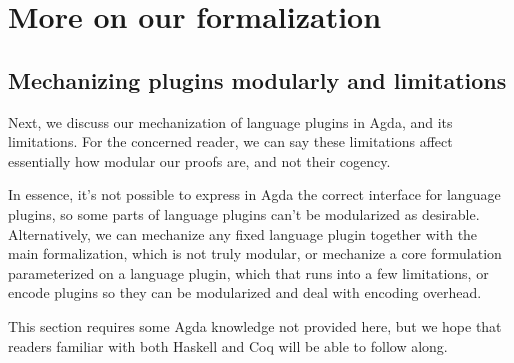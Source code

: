









\def\deriveDefCore{%
\begin{align*}
  \ensuremath{\Derive{\lambda (\Varid{x}\typcolon\sigma)\to \Varid{t}}} &= \ensuremath{\lambda (\Varid{x}\typcolon\sigma)\;(\Varid{dx}\typcolon\Delta \sigma)\to \Derive{\Varid{t}}} \\
  \ensuremath{\Derive{\Varid{s}\;\Varid{t}}} &= \ensuremath{\Derive{\Varid{s}}\;\Varid{t}\;\Derive{\Varid{t}}} \\
  \ensuremath{\Derive{\Varid{x}}} &= \ensuremath{\Varid{dx}} \\
  \ensuremath{\Derive{\Varid{c}}} &= \ensuremath{\DeriveConst{\Varid{c}}}
\end{align*}
}




\chapter{More on our formalization}
\section{Mechanizing plugins modularly and limitations}
\label{sec:modularity-limits}
Next, we discuss our mechanization of language plugins in Agda, and its
limitations. For the concerned reader, we can say these limitations affect
essentially how modular our proofs are, and not their cogency.

In essence, it's not possible to express in Agda the correct interface for
language plugins, so some parts of language plugins can't be modularized as desirable.
Alternatively, we can mechanize any fixed language plugin together with
the main formalization, which is not truly modular, or mechanize a core
formulation parameterized on a language plugin, which that runs into a few
limitations, or encode plugins so they can be modularized and deal with encoding
overhead.

This section requires some Agda knowledge not provided here, but
we hope that readers familiar with both Haskell and Coq will be
able to follow along.

